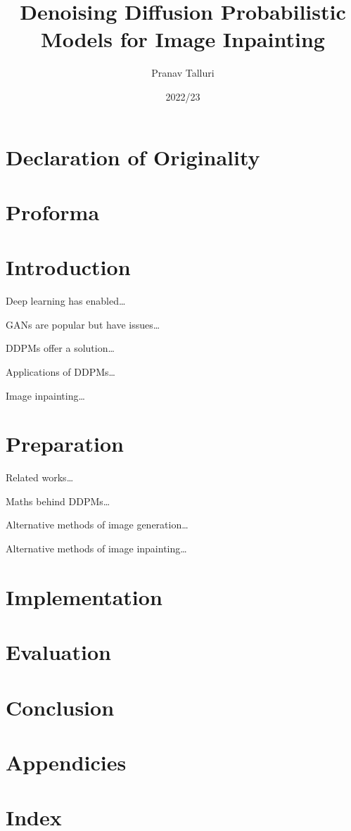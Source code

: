 \documentclass{article}
\title{Denoising Diffusion Probabilistic Models for Image Inpainting}
\author{Pranav Talluri}
\date{2022/23}
\begin{document}
\maketitle
\newpage
\section*{Declaration of Originality}
\newpage
\section*{Proforma}
\newpage
\tableofcontents
\newpage
\section{Introduction}

Deep learning has enabled\dots

GANs are popular but have issues\dots

DDPMs offer a solution\dots

Applications of DDPMs\dots

Image inpainting\dots

\newpage
\section{Preparation}

Related works\dots

Maths behind DDPMs\dots

Alternative methods of image generation\dots

Alternative methods of image inpainting\dots


\newpage
\section{Implementation}
\newpage
\section{Evaluation}
\newpage
\section{Conclusion}
\newpage
\printbibliography
\newpage
\section*{Appendicies}
\newpage
\section*{Index}
\newpage
\end{document}
